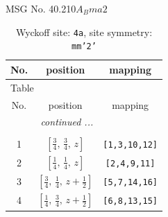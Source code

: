 \documentclass[fleqn,8pt]{jsarticle}
\begin{document}
\setcounter{MaxMatrixCols}{32}

\renewcommand{\tablename}{Table~}
\renewcommand{\figurename}{Figure~}
\begin{center}
\LARGE
MSG No. 40.210\quad$A_{B}ma2$
\end{center}
\renewcommand{\arraystretch}{1.2}
\begin{longtable}{ccc}
\caption{Wyckoff site: {\tt 4a}, site symmetry: {\tt mm'2'}}
 \\
 \hline \hline
No. & position & mapping \\ \hline \endfirsthead

\multicolumn{2}{l}{\tablename\ \thetable{}} \\
 \hline \hline
No. & position & mapping \\ \hline \endhead

 \hline \hline
\multicolumn{2}{r}{\footnotesize\it continued ...} \\ \endfoot

 \hline \hline
\multicolumn{2}{r}{} \\ \endlastfoot

1 & $\left[ \frac{3}{4},\, \frac{3}{4},\, z \right]$ & {\tt [1,3,10,12]} \\ \hline
2 & $\left[ \frac{1}{4},\, \frac{1}{4},\, z \right]$ & {\tt [2,4,9,11]} \\ \hline
3 & $\left[ \frac{3}{4},\, \frac{1}{4},\, z + \frac{1}{2} \right]$ & {\tt [5,7,14,16]} \\ \hline
4 & $\left[ \frac{1}{4},\, \frac{3}{4},\, z + \frac{1}{2} \right]$ & {\tt [6,8,13,15]} \\
\end{longtable}
\renewcommand{\arraystretch}{1.2}
\end{document}
